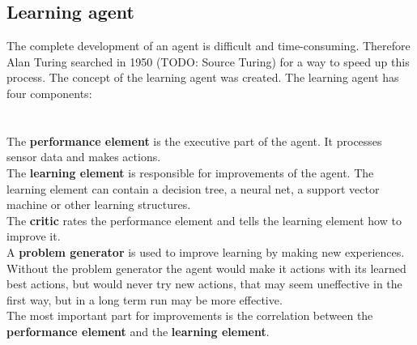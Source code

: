 \documentclass[10pt,a4paper,DIV=11]{scrreprt}
\begin{document}
\subsection{Learning agent}
The complete development of an agent is difficult and time-consuming. Therefore Alan Turing searched in 1950 (TODO: Source Turing) for a way to speed up this process. The concept of the learning agent was created. The learning agent has four components: \\

   \\
\\

The \textbf{performance element} is the executive part of the agent. It processes sensor data and makes actions. \\

The \textbf{learning element} is responsible for improvements of the agent. The learning element can contain a decision tree, a neural net, a support vector machine or other learning structures. \\

The \textbf{critic} rates the performance element and tells the learning element how to improve it. \\

A \textbf{problem generator} is used to improve learning by making new experiences. Without the problem generator the agent would make it actions with its learned best actions, but would never try new actions, that may seem uneffective in the first way, but in a long term run may be more effective. \\

The most important part for improvements is the correlation between the \textbf{performance element} and the \textbf{learning element}.
\end{document}
